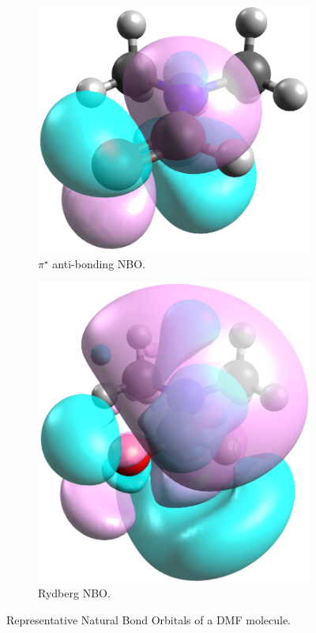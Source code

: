 \begin{refsection}
\begin{figure}
\begin{subfigure}{0.3\linewidth}
        \includegraphics[width=\linewidth]{Figures/dmfnbo-pistar.png}
        \caption{$ \pi^{\star} $ anti-bonding NBO.}
    \end{subfigure}

    \begin{subfigure}{0.3\linewidth}
        \includegraphics[width=\linewidth]{Figures/dmfnbo-rydberg.png}
        \caption{Rydberg NBO.}
    \end{subfigure}
    \caption{Representative Natural Bond Orbitals of a DMF molecule.}\label{fig:nbos}
\end{figure}


\end{refsection}
